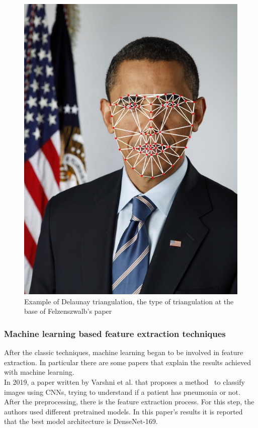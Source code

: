 \documentclass[conference]{IEEEtran}
\begin{document}
					\begin{figure}[!ht]
						\centerline{\includegraphics[height=0.4\textheight]{imgs/delaunay.jpg}}
						\caption{Example of Delaunay triangulation, the type of triangulation at the base of Felzenszwalb's paper}
						\label{fig:3}
					\end{figure}
					
				\subsubsection{Machine learning based feature extraction techniques} \label{mlfe}
					
					After the classic techniques, machine learning began to be involved in feature extraction. In particular there are some papers that explain the results achieved with machine learning.\\
					\noindent In 2019, a paper written by Varshni et al. that proposes a method~\cite{varshni2019pneumonia} to classify images using CNNs, trying to understand if a patient 
					has pneumonia or not. After the preprocessing, there is the feature extraction process. For this step, the authors used different pretrained models.
					In this paper's results it is reported that the best model architecture is DenseNet-169.
					
\end{document}
